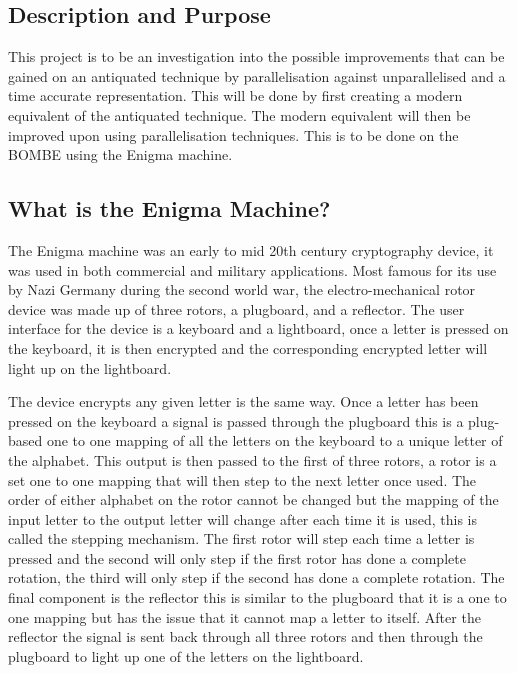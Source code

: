 \documentclass[12pt,a4paper]{article}
\begin{document}
\subsection{Description and Purpose}

This project is to be an investigation into the possible improvements that can be gained on an antiquated technique by parallelisation against unparallelised and a time accurate representation. This will be done by first creating a modern equivalent of the antiquated technique. The modern equivalent will then be improved upon using parallelisation techniques. This is to be done on the BOMBE using the Enigma machine.

\subsection{What is the Enigma Machine?}

The Enigma machine was an early to mid 20th century cryptography device, it was used in both commercial and military applications. Most famous for its use by Nazi Germany during the second world war, the electro-mechanical rotor device was made up of three rotors, a plugboard, and a reflector. The user interface for the device is a keyboard and a lightboard, once a letter is pressed on the keyboard, it is then encrypted and the corresponding encrypted letter will light up on the lightboard. 

The device encrypts any given letter is the same way. Once a letter has been pressed on the keyboard a signal is passed through the plugboard this is a plug-based one to one mapping of all the letters on the keyboard to a unique letter of the alphabet. This output is then passed to the first of three rotors, a rotor is a set one to one mapping that will then step to the next letter once used. The order of either alphabet on the rotor cannot be changed but the mapping of the input letter to the output letter will change after each time it is used, this is called the stepping mechanism. The first rotor will step each time a letter is pressed and the second will only step if the first rotor has done a complete rotation, the third will only step if the second has done a complete rotation. The final component is the reflector this is similar to the plugboard that it is a one to one mapping but has the issue that it cannot map a letter to itself. After the reflector the signal is sent back through all three rotors and then through the plugboard to light up one of the letters on the lightboard. 
\end{document}
